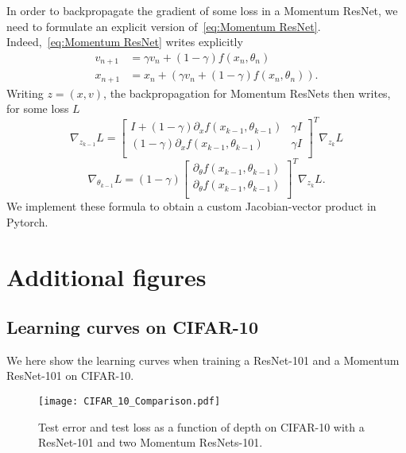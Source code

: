 \documentclass{article}
\begin{document}
In order to backpropagate the gradient of some loss in a Momentum ResNet, we need to formulate an explicit version of~\eqref{eq:Momentum ResNet}.
Indeed,~\eqref{eq:Momentum ResNet} writes explicitly 
\begin{equation}
\begin{split}
  v_{n+1} & = \gamma v_n + (1-\gamma) f(x_n,\theta_n)\\ 
  x_{n+1} & = x_n + (\gamma v_n + (1-\gamma) f(x_n,\theta_n)).
\end{split}
\end{equation}
Writing $z=(x,v)$, the backpropagation for Momentum ResNets then writes, for some loss $L$ 
$$
\nabla_{z_{k-1}}L=  \left[ {\begin{array}{cc}
  I +  (1-\gamma) \partial_xf(x_{k-1},\theta_{k-1}) &  \gamma I\\
   (1-\gamma) \partial_xf(x_{k-1},\theta_{k-1}) & \gamma I \\
  \end{array} } \right]^{T} \nabla_{z_{k}}L
$$
$$
\nabla_{\theta_{k-1}}L = (1 - \gamma) \left[ {\begin{array}{cc}
 \partial_{\theta}f(x_{k-1},\theta_{k-1}) \\
   \partial_{\theta}f(x_{k-1},\theta_{k-1})  \\
  \end{array} } \right]^{T} \nabla_{z_{k}}L.
$$
We implement these formula to obtain a custom Jacobian-vector product in Pytorch.

\section{Additional figures}\label{app:figures}

\subsection{Learning curves on CIFAR-10}

We here show the learning curves when training a ResNet-101 and a Momentum ResNet-101 on CIFAR-10.

\begin{figure}[H]
\vskip 0.2in
\begin{center}
\centerline{\texttt{[image: CIFAR\_10\_Comparison.pdf]}}
\caption{Test error and test loss as a function of depth on CIFAR-10 with a ResNet-101 and two Momentum ResNets-101.}
\end{center}
\vskip -0.2in
\end{figure}
\end{document}
